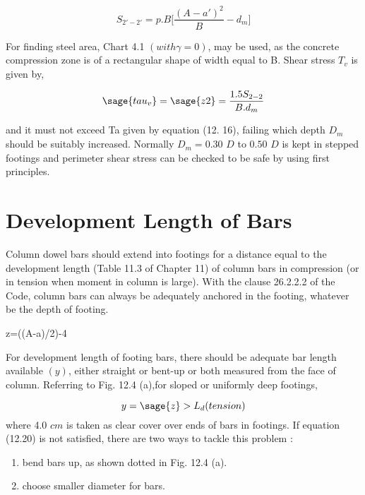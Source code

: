 \begin{equation}                                                        
        S_{2'-2'}=p.B\bigg[\frac{(A-a')^2}{B}-d_m\bigg]                                 
\end{equation}

For finding steel area, Chart 4.1 $(with \gamma = 0)$, may be used, as the concrete compression zone is of a rectangular shape of width equal to B. Shear stress $T_v$ is given by,

\begin{equation}
        \sage{tau_v}=\sage{z2}=\frac{1.5S_{2-2}}{B.d_m}
\end{equation}

and it must not exceed Ta given by equation (12. 16), failing which depth $D_m$ should be suitably increased.
Normally $D_m = 0.30$ $D$ to $0.50$ $D$ is kept in stepped footings and perimeter shear stress can be checked to be safe by using ﬁrst principles.

\section{Development Length of Bars}
Column dowel bars should extend into footings for a distance equal to the development
length (Table 11.3 of Chapter 11) of column bars in compression (or in tension when moment in column is large). With the clause 26.2.2.2 of the Code, column bars can always be adequately anchored in the footing, whatever be the depth of footing. 

\begin{sagesilent}
        z=((A-a)/2)-4                    
\end{sagesilent}

For development length of footing bars, there should be adequate bar length available $(y)$, either straight or bent-up or both measured from the face of column. Referring to Fig. 12.4 (a),for sloped or uniformly deep footings,

\begin{equation}
        y= \sage{z} >L_d (tension)
\end{equation}
where 4.0 $cm$ is taken as clear cover over ends of bars in footings. If equation (12.20) is not  satisfied, there are two ways to tackle this problem :

\begin{enumerate}
\item bend bars up, as shown dotted in Fig. 12.4 (a).
\item choose smaller diameter for bars.
\end{enumerate}

